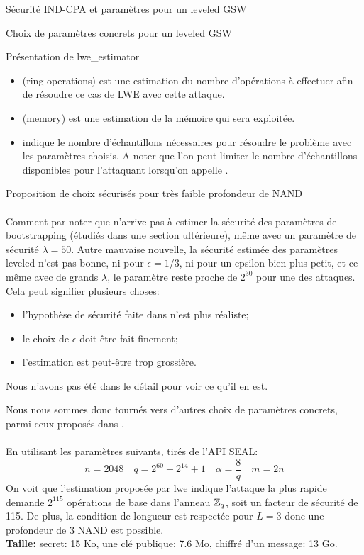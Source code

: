 \begin{section}{Sécurité IND-CPA et paramètres pour un leveled GSW}
\begin{subsection}{Choix de paramètres concrets pour un leveled GSW}
\begin{subsubsection}{Présentation de lwe\_estimator}
\begin{itemize}
\item {} (ring operations) est une estimation du nombre d'opérations à effectuer afin de résoudre ce cas de LWE avec cette attaque.
\item  {} (memory) est une estimation de la mémoire qui sera exploitée.
\item {} indique le nombre d'échantillons nécessaires pour résoudre le problème avec les paramètres choisis. 
A noter que l'on peut limiter le nombre d'échantillons disponibles pour l'attaquant
lorsqu'on appelle .
\end{itemize}

\end{subsubsection}
\begin{subsubsection}{Proposition de choix sécurisés pour très faible profondeur de NAND} \label{sec:choix_concrets}
\paragraph{}

Comment par noter que  n'arrive pas à estimer la sécurité des paramètres de bootstrapping (étudiés
dans une section ultérieure), même 
avec un paramètre de sécurité $\lambda = 50$. Autre mauvaise nouvelle, la sécurité estimée des paramètres leveled
n'est pas bonne, ni pour $\epsilon = 1/3$, ni pour un epsilon bien plus petit, et ce même avec de grands $\lambda$, 
le paramètre  reste proche de $2^{30}$ pour une des attaques. Cela peut signifier plusieurs choses:
\begin{itemize}
\item l'hypothèse de sécurité faite dans \cite{halevi} n'est plus réaliste;
\item le choix de $\epsilon$ doit être fait finement;
\item l'estimation est peut-être trop grossière.
\end{itemize}
Nous n'avons pas été dans le détail pour voir ce qu'il en est.

Nous nous sommes donc tournés vers d'autres choix de paramètres concrets, parmi ceux proposés dans 
\cite{estimator}.

\paragraph{}
En utilisant les paramètres suivants, tirés de l'API SEAL: 
\[n = 2048\quad q = 2^{60} - 2^{14} + 1 \quad \alpha = \frac{8}{q}\quad m = 2n \] 
On voit que l'estimation proposée par lwe indique  l'attaque la plus rapide demande $2^{115}$
opérations de base dans l'anneau $\mathbb{Z}_q$, soit un facteur de sécurité de 115. De plus, la condition de longueur
est respectée pour $L=3$ donc une profondeur de 3 NAND est possible. \\ 
\textbf{Taille:} secret: 15 Ko, une clé publique: 7.6 Mo, chiffré d'un message: 13 Go.


\end{subsubsection}
\end{subsection}
\end{section}
